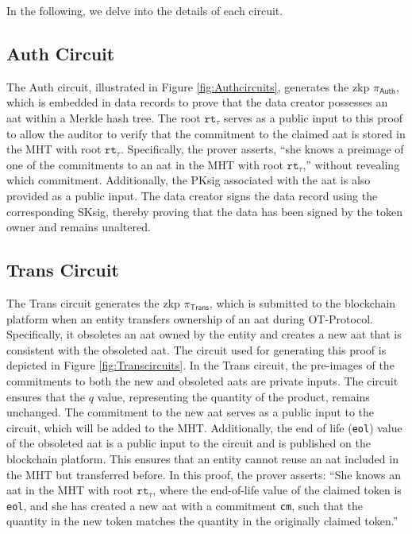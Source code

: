 In the following, we delve into the details of each circuit.



\subsection{\textsf{Auth} Circuit} 
The \textsf{Auth} circuit, illustrated in Figure \ref{fig:Authcircuits}, generates the \gls{zkp} $\pi_\textsf{Auth}$, which is embedded in data records to prove that the data creator possesses an \gls{aat} within a Merkle hash tree. The root $\texttt{rt}_\tau$ serves as a public input to this proof to allow the auditor to verify that the commitment to the claimed \gls{aat} is stored in the \textsf{MHT} with root $\texttt{rt}_\tau$. Specifically, the prover asserts, ``she knows a preimage of one of the commitments to an \gls{aat} in the \textsf{MHT} with root $\texttt{rt}_\tau$,'' without revealing which commitment. Additionally, the PKsig associated with the \gls{aat} is also provided as a public input. The data creator signs the data record using the corresponding SKsig, thereby proving that the data has been signed by the token owner and remains unaltered.


\subsection{\textsf{Trans} Circuit} 
The \textsf{Trans} circuit generates the \gls{zkp} $\pi_\textsf{Trans}$, which is submitted to the blockchain platform when an entity transfers ownership of an \gls{aat} during \textsf{OT-Protocol}. Specifically, it obsoletes an \gls{aat} owned by the entity and creates a new \gls{aat} that is consistent with the obsoleted \gls{aat}. The circuit used for generating this proof is depicted in Figure \ref{fig:Transcircuits}.  In the \textsf{Trans} circuit, the pre-images of the commitments to both the new and obsoleted \gls{aat}s are private inputs. The circuit ensures that the $q$ value, representing the quantity of the product, remains unchanged. The commitment to the new \gls{aat} serves as a public input to the circuit, which will be added to the \textsf{MHT}. Additionally, the end of life (\texttt{eol}) value of the obsoleted \gls{aat} is a public input to the circuit and is published on the blockchain platform. This ensures that an entity cannot reuse an \gls{aat} included in the \textsf{MHT} but transferred before. In this proof, the prover asserts: ``She knows an \gls{aat} in the \textsf{MHT} with root $\texttt{rt}_\tau$, where the end-of-life value of the claimed token is \texttt{eol}, and she has created a new \gls{aat} with a commitment \texttt{cm}, such that the quantity in the new token matches the quantity in the originally claimed token.''



